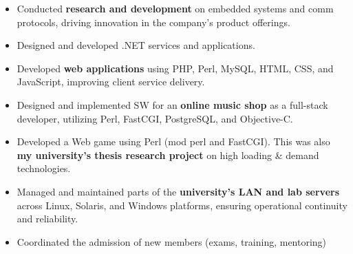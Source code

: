\documentclass[10pt,a4paper]{altacv}
\begin{document}
{}

\begin{itemize}
	\item Conducted \textbf{research and development} on embedded systems and comm protocols, driving innovation in the company’s product offerings.
	\item Designed and developed .NET services and applications.
\end{itemize}


\begin{itemize}
	\item Developed \textbf{web applications} using PHP, Perl, MySQL, HTML, CSS, and JavaScript, improving client service delivery.
\end{itemize}

\divider

\begin{itemize}
	\item Designed and implemented SW for an \textbf{online music shop} as a full-stack developer, utilizing Perl, FastCGI, PostgreSQL, and Objective-C.
\end{itemize}

\divider

\begin{itemize}
	\item Developed a Web game using Perl (mod perl and FastCGI). This was also \textbf{my university's thesis research project} on high loading \& demand technologies.
\end{itemize}

\divider

\begin{itemize}
	\item Managed and maintained parts of the \textbf{university’s LAN and lab servers} across Linux, Solaris, and Windows platforms, ensuring operational continuity and reliability.
	\item Coordinated the admission of new members (exams, training, mentoring)
\end{itemize}
\end{document}
